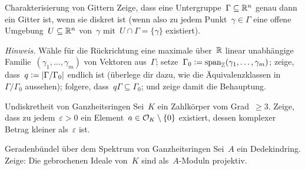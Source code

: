 \documentclass{uebblatt}
\begin{document}
\begin{aufgabe}{Charakterisierung von Gittern}
Zeige, dass eine Untergruppe~$\Gamma \subseteq \mathbb{R}^n$ genau dann ein Gitter
ist, wenn sie diskret ist (wenn also zu jedem Punkt~$\gamma \in \Gamma$ eine
offene Umgebung~$U \subseteq \mathbb{R}^n$ von~$\gamma$ mit~$U \cap \Gamma =
\{\gamma\}$ existiert).

{\tiny\emph{Hinweis.} Wähle für die Rückrichtung eine maximale
über~$\mathbb{R}$ linear unabhängige Familie~$(\gamma_1,\ldots,\gamma_m)$ von Vektoren
aus~$\Gamma$; setze~$\Gamma_0 \vcentcolon=
\operatorname{span}_{\mathbb{Z}}(\gamma_1,\ldots,\gamma_m)$; zeige, dass~$q \vcentcolon=
|\Gamma/\Gamma_0|$ endlich ist (überlege dir dazu, wie die Äquivalenzklassen
in~$\Gamma/\Gamma_0$ aussehen); folgere, dass~$q\Gamma \subseteq \Gamma_0$; und
zeige damit die Behauptung.\par}
\end{aufgabe}

\begin{aufgabe}{Undiskretheit von Ganzheitsringen}
Sei~$K$ ein Zahlkörper vom Grad~$\geq 3$. Zeige, dass zu jedem~$\varepsilon >
0$ ein Element~$a \in \mathcal{O}_K \setminus \{0\}$ existiert, dessen komplexer Betrag
kleiner als~$\varepsilon$ ist.
\end{aufgabe}

\begin{aufgabe*}{Geradenbündel über dem Spektrum von Ganzheitsringen}
Sei~$A$ ein Dedekindring. Zeige: Die gebrochenen Ideale von~$K$ sind
als~$A$-Moduln projektiv.
\end{aufgabe*}
\end{document}

